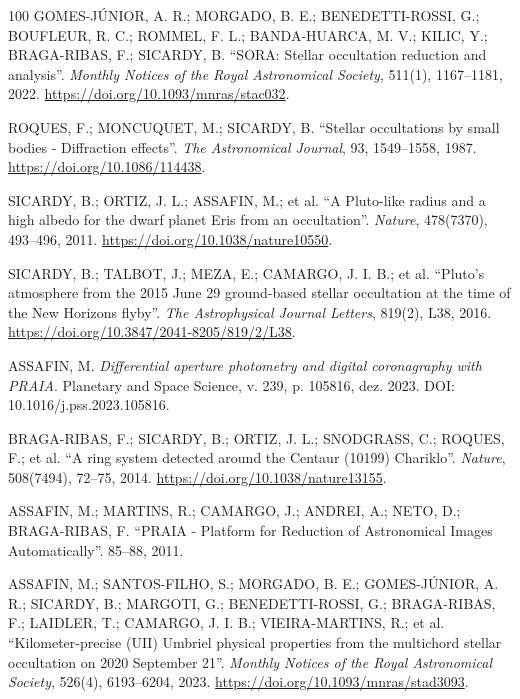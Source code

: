 \documentclass[msc]{on} %
\begin{document}
\begin{thebibliography}{100}
 GOMES-JÚNIOR, A. R.; MORGADO, B. E.; BENEDETTI-ROSSI, G.; BOUFLEUR, R. C.; ROMMEL, F. L.; BANDA-HUARCA, M. V.; KILIC, Y.; BRAGA-RIBAS, F.; SICARDY, B. ``SORA: Stellar occultation reduction and analysis''. \emph{Monthly Notices of the Royal Astronomical Society}, 511(1), 1167--1181, 2022. \url{https://doi.org/10.1093/mnras/stac032}.

 ROQUES, F.; MONCUQUET, M.; SICARDY, B. ``Stellar occultations by small bodies - Diffraction effects''. \emph{The Astronomical Journal}, 93, 1549--1558, 1987. \url{https://doi.org/10.1086/114438}.

 SICARDY, B.; ORTIZ, J. L.; ASSAFIN, M.; et al. ``A Pluto-like radius and a high albedo for the dwarf planet Eris from an occultation''. \emph{Nature}, 478(7370), 493--496, 2011. \url{https://doi.org/10.1038/nature10550}.

 SICARDY, B.; TALBOT, J.; MEZA, E.; CAMARGO, J. I. B.; et al. ``Pluto's atmosphere from the 2015 June 29 ground-based stellar occultation at the time of the New Horizons flyby''. \emph{The Astrophysical Journal Letters}, 819(2), L38, 2016. \url{https://doi.org/10.3847/2041-8205/819/2/L38}.

 ASSAFIN, M. \textit{Differential aperture photometry and digital coronagraphy with PRAIA}. Planetary and Space Science, v. 239, p. 105816, dez. 2023. DOI: 10.1016/j.pss.2023.105816.

 BRAGA-RIBAS, F.; SICARDY, B.; ORTIZ, J. L.; SNODGRASS, C.; ROQUES, F.; et al. ``A ring system detected around the Centaur (10199) Chariklo''. \emph{Nature}, 508(7494), 72--75, 2014. \url{https://doi.org/10.1038/nature13155}.

 ASSAFIN, M.; MARTINS, R.; CAMARGO, J.; ANDREI, A.; NETO, D.; BRAGA-RIBAS, F. ``PRAIA - Platform for Reduction of Astronomical Images Automatically''. 85--88, 2011.

 ASSAFIN, M.; SANTOS-FILHO, S.; MORGADO, B. E.; GOMES-JÚNIOR, A. R.; SICARDY, B.; MARGOTI, G.; BENEDETTI-ROSSI, G.; BRAGA-RIBAS, F.; LAIDLER, T.; CAMARGO, J. I. B.; VIEIRA-MARTINS, R.; et al. ``Kilometer-precise (UII) Umbriel physical properties from the multichord stellar occultation on 2020 September 21''. \emph{Monthly Notices of the Royal Astronomical Society}, 526(4), 6193--6204, 2023. \url{https://doi.org/10.1093/mnras/stad3093}.


\end{thebibliography}
\end{document}
